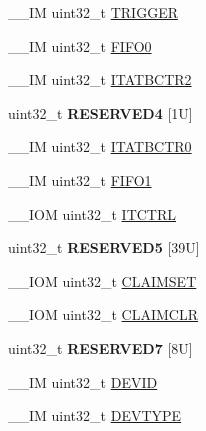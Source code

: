 \begin{DoxyCompactItemize}
\item 
\-\_\-\-\_\-\-I\-M uint32\-\_\-t \hyperlink{struct_t_p_i___type_a4d4cd2357f72333a82a1313228287bbd}{T\-R\-I\-G\-G\-E\-R}
\item 
\-\_\-\-\_\-\-I\-M uint32\-\_\-t \hyperlink{struct_t_p_i___type_aa4d7b5cf39dff9f53bf7f69bc287a814}{F\-I\-F\-O0}
\item 
\-\_\-\-\_\-\-I\-M uint32\-\_\-t \hyperlink{struct_t_p_i___type_ab358319b969d3fed0f89bbe33e9f1652}{I\-T\-A\-T\-B\-C\-T\-R2}
\item 
\hypertarget{struct_t_p_i___type_aad2125842c9abfbfc7db9e440ecf4280}{uint32\-\_\-t {\bfseries R\-E\-S\-E\-R\-V\-E\-D4} \mbox{[}1\-U\mbox{]}}\label{struct_t_p_i___type_aad2125842c9abfbfc7db9e440ecf4280}

\item 
\-\_\-\-\_\-\-I\-M uint32\-\_\-t \hyperlink{struct_t_p_i___type_aaa573b2e073e76e93c51ecec79c616d0}{I\-T\-A\-T\-B\-C\-T\-R0}
\item 
\-\_\-\-\_\-\-I\-M uint32\-\_\-t \hyperlink{struct_t_p_i___type_a061372fcd72f1eea871e2d9c1be849bc}{F\-I\-F\-O1}
\item 
\-\_\-\-\_\-\-I\-O\-M uint32\-\_\-t \hyperlink{struct_t_p_i___type_aaa4c823c10f115f7517c82ef86a5a68d}{I\-T\-C\-T\-R\-L}
\item 
\hypertarget{struct_t_p_i___type_a9c1ac143e09b64b1f6eb92ecd65d60d0}{uint32\-\_\-t {\bfseries R\-E\-S\-E\-R\-V\-E\-D5} \mbox{[}39\-U\mbox{]}}\label{struct_t_p_i___type_a9c1ac143e09b64b1f6eb92ecd65d60d0}

\item 
\-\_\-\-\_\-\-I\-O\-M uint32\-\_\-t \hyperlink{struct_t_p_i___type_af8b7d15fa5252b733dd4b11fa1b5730a}{C\-L\-A\-I\-M\-S\-E\-T}
\item 
\-\_\-\-\_\-\-I\-O\-M uint32\-\_\-t \hyperlink{struct_t_p_i___type_a0e10e292cb019a832b03ddd055b2f6ac}{C\-L\-A\-I\-M\-C\-L\-R}
\item 
\hypertarget{struct_t_p_i___type_a33bb14730a444fdeeb91ea9cb7218e62}{uint32\-\_\-t {\bfseries R\-E\-S\-E\-R\-V\-E\-D7} \mbox{[}8\-U\mbox{]}}\label{struct_t_p_i___type_a33bb14730a444fdeeb91ea9cb7218e62}

\item 
\-\_\-\-\_\-\-I\-M uint32\-\_\-t \hyperlink{struct_t_p_i___type_abc0ecda8a5446bc754080276bad77514}{D\-E\-V\-I\-D}
\item 
\-\_\-\-\_\-\-I\-M uint32\-\_\-t \hyperlink{struct_t_p_i___type_ad98855854a719bbea33061e71529a472}{D\-E\-V\-T\-Y\-P\-E}
\end{DoxyCompactItemize}



